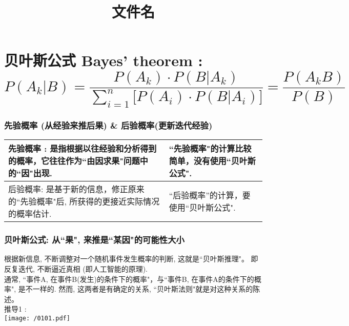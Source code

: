 \documentclass[UTF8]{ctexart}
\title{文件名}
\begin{document}
	\tableofcontents %
	\date{} %
	\maketitle  %
	



\part{贝叶斯公式 Bayes' theorem : \\ $ \boxed{
		P\left( A_k|B \right) =\dfrac{P\left( A_k \right) \cdot P\left( B|A_k \right)}{\sum_{i=1}^n{\text{[}}P\left( A_i \right) \cdot P\left( B|A_i \right) \text{]}}=\dfrac{P\left( A_kB \right)}{P\left( B \right)}
	}	$}




\section{先验概率 (从经验来推后果) \& 后验概率(更新迭代经验)}

\begin{tabular}{|p{}|p{}|}
	\hline
	先验概率 :	是指根据以往经验和分析得到的概率，它往往作为``由因求果"问题中的``因"出现.  
	&   
	``先验概率"的计算比较简单，没有使用``贝叶斯公式". \\
	\hline
	后验概率: 是基于新的信息，修正原来的``先验概率"后, 所获得的更接近实际情况的概率估计.	
	& ``后验概率''的计算，要使用``贝叶斯公式".
	\\
	\hline
\end{tabular} 
\vspace{1em} 



\section{贝叶斯公式: 从``果", 来推是``某因"的可能性大小}

根据新信息, 不断调整对一个随机事件发生概率的判断, 这就是``贝叶斯推理"。 即反复迭代, 不断逼近真相 (即人工智能的原理). \\

通常, ``事件A, 在事件B(发生)的条件下的概率"，与``事件B, 在事件A的条件下的概率", 是不一样的. 然而, 这两者是有确定的关系, ``贝叶斯法则"就是对这种关系的陈述。 \\

推导1 : \\
\texttt{[image: /0101.pdf]} \\
\end{document}
